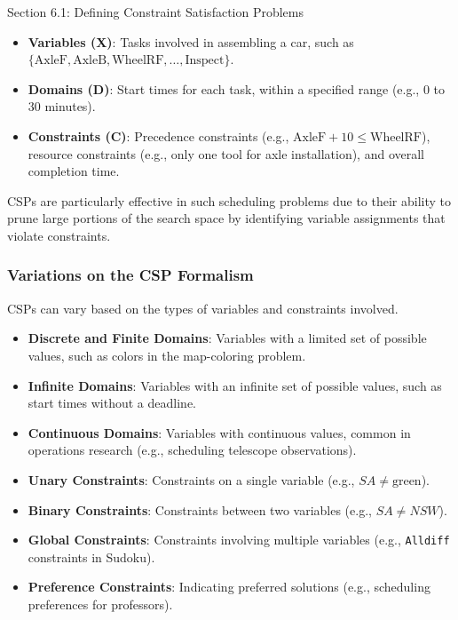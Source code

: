 \begin{notes}{Section 6.1: Defining Constraint Satisfaction Problems}
\begin{highlight}
        \begin{itemize}
            \item \textbf{Variables (X)}: Tasks involved in assembling a car, such as $\{\text{AxleF}, \text{AxleB}, \text{WheelRF}, \ldots, \text{Inspect}\}$.
            \item \textbf{Domains (D)}: Start times for each task, within a specified range (e.g., 0 to 30 minutes).
            \item \textbf{Constraints (C)}: Precedence constraints (e.g., $\text{AxleF} + 10 \leq \text{WheelRF}$), resource constraints (e.g., only one tool for axle installation), and overall completion time.
        \end{itemize}
    
    \end{highlight}
    
    CSPs are particularly effective in such scheduling problems due to their ability to prune large portions of the search space by identifying variable assignments that violate constraints.
    
    \subsubsection*{Variations on the CSP Formalism}
    
    CSPs can vary based on the types of variables and constraints involved.
    
    \begin{highlight}
    
        \begin{itemize}
            \item \textbf{Discrete and Finite Domains}: Variables with a limited set of possible values, such as colors in the map-coloring problem.
            \item \textbf{Infinite Domains}: Variables with an infinite set of possible values, such as start times without a deadline.
            \item \textbf{Continuous Domains}: Variables with continuous values, common in operations research (e.g., scheduling telescope observations).
            \item \textbf{Unary Constraints}: Constraints on a single variable (e.g., $SA \neq \text{green}$).
            \item \textbf{Binary Constraints}: Constraints between two variables (e.g., $SA \neq NSW$).
            \item \textbf{Global Constraints}: Constraints involving multiple variables (e.g., \texttt{Alldiff} constraints in Sudoku).
            \item \textbf{Preference Constraints}: Indicating preferred solutions (e.g., scheduling preferences for professors).
        \end{itemize}
    

\end{highlight}
\end{notes}
